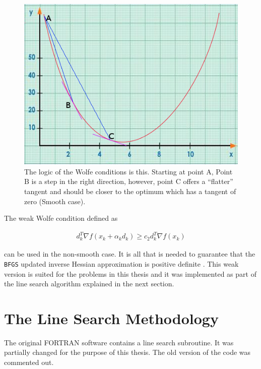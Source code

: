\begin{figure} 
\begin{center}
\includegraphics[scale=0.65]{Figures/wolfe.png}
\caption[The Idea behind the Wolfe Condition]{The logic of the Wolfe conditions is this. Starting at point A, Point B is a step in the right direction, however, point C offers a ``flatter'' tangent and should be closer to the optimum which has a tangent of zero (Smooth case).}
\label{Wolfefigure}
\end{center}
\end{figure}

The weak Wolfe condition defined as

\begin{equation}
  \begin{aligned}
    d_k^T \nabla f(x_k + \alpha _k d_k) \geq c_2 d_k^T \nabla f(x_k)
  \end{aligned}
\end{equation}

can be used in the non-smooth case. It is all that is needed to guarantee that the \texttt{BFGS} updated inverse Hessian approximation is positive definite \citep{nocedal}. This weak version is suited for the problems in this thesis and it was implemented as part of the line search algorithm explained in the next section.

\section{The Line Search Methodology}

The original \textsc{FORTRAN} software \citep{lbfgsbsoftware} contains a line search subroutine. It was partially changed for the purpose of this thesis. The old version of the code was commented out. 

